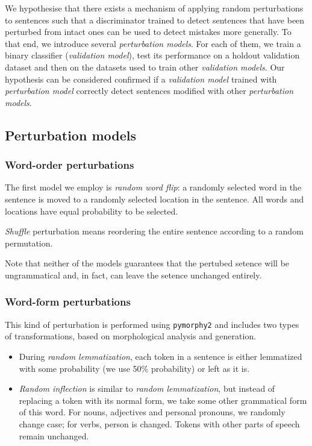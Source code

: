 \documentclass[11pt,a4paper]{article}
\begin{document}
We hypothesise that there exists a mechanism of applying random perturbations to sentences such that a discriminator trained to detect sentences that have been perturbed from intact ones can be used to detect mistakes more generally.
To that end, we introduce several \emph{perturbation models}.
For each of them, we train a binary classifier (\emph{validation model}), test its performance on a holdout validation dataset and then on the datasets used to train other \emph{validation models}.
Our hypothesis can be considered confirmed if a \emph{validation model} trained with \emph{perturbation model} correctly detect sentences modified with other \emph{perturbation models}.

\subsection{Perturbation models}

\begin{figure}
\end{figure}

\subsubsection{Word-order perturbations}

The first model we employ is \emph{random word flip}: a randomly selected word in the sentence is moved to a randomly selected location in the sentence.
All words and locations have equal probability to be selected.

\emph{Shuffle} perturbation means reordering the entire sentence according to a random permutation.

Note that neither of the models guarantees that the pertubed setence will be ungrammatical and, in fact, can leave the setence unchanged entirely.

\subsubsection{Word-form perturbations}

This kind of perturbation is performed using \texttt{pymorphy2} \cite{pymorphy2} and includes two types of transformations, based on morphological analysis and generation.

\begin{itemize}
    \item During \emph{random lemmatization}, each token in a sentence is either lemmatized with some probability (we use 50\% probability) or left as it is.
    \item \emph{Random inflection} is similar to \emph{random lemmatization}, but instead of replacing a token with its normal form, we take some other grammatical form of this word. For nouns, adjectives and personal pronouns, we randomly change case; for verbs, person is changed. Tokens with other parts of speech remain unchanged.
\end{itemize}
\end{document}
